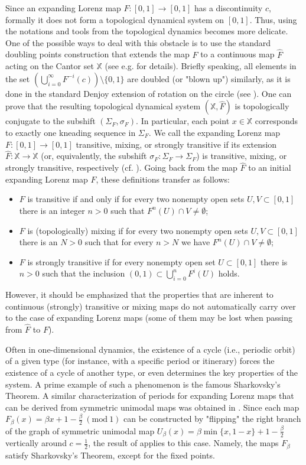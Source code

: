 \documentclass[10pt,reqno]{amsart}
\theoremstyle{plain}
\theoremstyle{assumption}
\theoremstyle{notation}
\theoremstyle{claim}
\theoremstyle{conj}
\theoremstyle{theorem}
\theoremstyle{proposition}
\theoremstyle{corollary}
\newcommand{\Mod}[1]{\ (\mathrm{mod}\ #1)}
\begin{document}
Since an expanding Lorenz map $F\colon[0,1]\to[0,1]$ has a discontinuity $c$, formally it does not form a topological dynamical system on $[0,1]$. Thus, using the notations and tools from the topological dynamics becomes more delicate. One of the possible ways to deal with this obstacle is to use the standard doubling points construction that extends the map $F$ to a continuous map $\hat{F}$ acting on the Cantor set $\mathbb{X}$ (see e.g. \cite{Raith} for details). Briefly speaking, all elements in the set $(\bigcup_{i=0}^\infty F^{-i}(c))\setminus\{0,1\}$ are doubled (or "blown up") similarly, as it is done in the standard Denjoy extension of rotation on the circle (see \cite[Example~14.9]{Dev}). One can prove that the resulting topological dynamical system $(\mathbb{X},\hat{F})$ is topologically conjugate to the subshift $(\Sigma_F,\sigma_F)$. In particular, each point $x\in\mathbb{X}$ corresponds to exactly one kneading sequence in $\Sigma_F$. We call the expanding Lorenz map $F\colon[0,1]\to[0,1]$ transitive, mixing, or strongly transitive if its extension $\hat{F}\colon\mathbb{X}\to\mathbb{X}$ (or, equivalently, the subshift $\sigma_F\colon\Sigma_F\to\Sigma_F$) is transitive, mixing, or strongly transitive, respectively (cf. \cite{OPR,ChO}). Going back from the map $\hat{F}$ to an initial expanding Lorenz map $F$, these definitions transfer as follows:
\begin{itemize}
    \item $F$ is transitive if and only if for every two nonempty open sets $U,V\subset [0,1]$ there is an integer $n>0$ such that $F^n(U)\cap V\neq\emptyset$;
    \item $F$ is (topologically) mixing if for every two nonempty open sets $U, V\subset [0,1]$ there is an $N>0$ such that for every $n>N$ we have $F^n(U)\cap V\neq\emptyset$;
    \item $F$ is strongly transitive if for every nonempty open set $U\subset [0,1]$ there is $n>0$ such that the inclusion $(0,1)\subset\bigcup_{i=0}^n F^i(U)$ holds.
\end{itemize}
However, it should be emphasized that the properties that are inherent to continuous (strongly) transitive or mixing maps do not automatically carry over to the case of expanding Lorenz maps (some of them may be lost when passing from $\hat{F}$ to $F$).

Often in one-dimensional dynamics, the existence of a cycle (i.e., periodic orbit) of a given type (for instance, with a specific period or itinerary) forces the existence of a cycle of another type, or even determines the key properties of the system. A prime example of such a phenomenon is the famous Sharkovsky's Theorem. A similar characterization of periods for expanding Lorenz maps that can be derived from symmetric unimodal maps was obtained in \cite{ABC}. Since each map $F_{\beta}(x)=\beta x+1-\frac{\beta}{2}\Mod{1}$ can be constructed by "flipping" the right branch of the graph of symmetric unimodal map $U_{\beta}(x)=\beta\min\{x,1-x\}+1-\frac{\beta}{2}$ vertically around $c=\frac{1}{2}$, the result of \cite{ABC} applies to this case. Namely, the maps $F_{\beta}$ satisfy Sharkovsky's Theorem, except for the fixed points.
\end{document}

